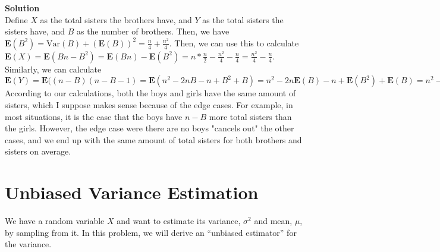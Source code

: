 \documentclass[11pt]{article}
\newcommand*{\Question}[1]{\section{#1}}
\newenvironment{Answer}{\vspace{10pt}\begin{mdframed}\textbf{Solution}\\}{\end{mdframed}\vfill\pagebreak[3]}
\newenvironment{Answer}{\vspace{10pt}}{\vfill\pagebreak[3]}
\newcommand*{\E}{\textbf{E}}
\newcommand*{\Var}[1]{\text{Var}(#1)}
\begin{document}
\begin{Answer}
Define $X$ as the total sisters the brothers have, and $Y$ as the total sisters the sisters have, and $B$ as the number of brothers. Then, we have $\E(B^2)=\Var{B}+(\E(B))^2=\frac{n}{4}+\frac{n^2}{4}$. Then, we can use this to calculate $\E(X)=\E(Bn-B^2)=\E(Bn)-\E(B^2)=n*\frac{n}{2}-\frac{n^2}{4}-\frac{n}{4}=\frac{n^2}{4}-\frac{n}{4}$. Similarly, we can calculate $\E(Y)=\E((n-B)(n-B-1)=\E(n^2-2nB-n+B^2+B)=n^2-2n\E(B)-n+\E(B^2)+\E(B)=n^2-2n(\frac{n}{2})-n+\frac{n^2}{4}+\frac{n}{4}+\frac{n}{2}=n^2-n^2-n+\frac{n^2}{4}+\frac{3n}{4}=\frac{-n^2}{2}+\frac{3n}{4}+\frac{n^2}{4}-\frac{n}{4}=\frac{n^2}{4}-\frac{n}{4}$ \\
According to our calculations, both the boys and girls have the same amount of sisters, which I suppose makes sense because of the edge cases. For example, in most situations, it is the case that the boys have $n-B$ more total sisters than the girls. However, the edge case were there are no boys "cancels out" the other cases, and we end up with the same amount of total sisters for both brothers and sisters on average.
\end{Answer}

\Question{Unbiased Variance Estimation}

We have a random variable $X$ and want to estimate its variance,
$\sigma^2$ and mean, $\mu$, by sampling from it.  In this problem, we
will derive an ``unbiased estimator'' for the variance.
\end{document}
